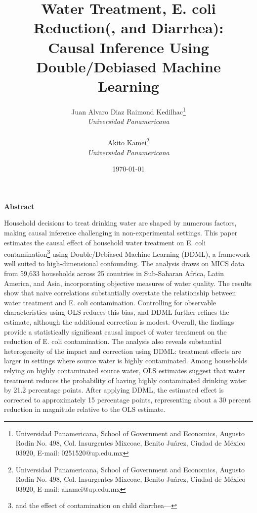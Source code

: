 \documentclass [11pt]{article}
\theoremstyle{plain}
\theoremstyle{definition}
\theoremstyle{remark}
\newcommand{\1}{\bm{1}}
\begin{document}
\title{Water Treatment, E. coli Reduction(, and Diarrhea):\\
Causal Inference Using Double/Debiased Machine Learning%
}

\author{Juan Alvaro Diaz Raimond Kedilhac\footnote{Universidad Panamericana, School of Government and Economics, Augusto Rodin No. 498, Col. Insurgentes Mixcoac, Benito Juárez, Ciudad de México 03920, E-mail: 0251520@up.edu.mx}\\
\textit{Universidad Panamericana}\\
~\\
Akito Kamei\footnote{Universidad Panamericana, School of Government and Economics, Augusto Rodin No. 498, Col. Insurgentes Mixcoac, Benito Juárez, Ciudad de México 03920, E-mail: akamei@up.edu.mx}\\
\textit{Universidad Panamericana}\\
}
\date{\today}
\maketitle  

\newcommand{\ToTSample}{59,633}
\newcommand{\ToTSelected}{64,420}

\begin{center}
\textbf{Abstract}
\end{center}  
\begin{singlespace}
Household decisions to treat drinking water are shaped by numerous factors, making causal inference challenging in non-experimental settings. This paper estimates the causal effect of household water treatment on E. coli contamination\footnote{and the effect of contamination on child diarrhea—} using Double/Debiased Machine Learning (DDML), a framework well suited to high-dimensional confounding. The analysis draws on MICS data from \ToTSample{} households across 25 countries in Sub-Saharan Africa, Latin America, and Asia, incorporating objective measures of water quality. The results show that naive correlations substantially overstate the relationship between water treatment and E. coli contamination. Controlling for observable characteristics using OLS reduces this bias, and DDML further refines the estimate, although the additional correction is modest. Overall, the findings provide a statistically significant causal impact of water treatment on the reduction of E. coli contamination. The analysis also reveals substantial heterogeneity of the impact and correction using DDML: treatment effects are larger in settings where source water is highly contaminated. Among households relying on highly contaminated source water, OLS estimates suggest that water treatment reduces the probability of having highly contaminated drinking water by 21.2 percentage points. After applying DDML, the estimated effect is corrected to approximately 15 percentage points, representing about a 30 percent reduction in magnitude relative to the OLS estimate.


\end{singlespace}
\end{document}
